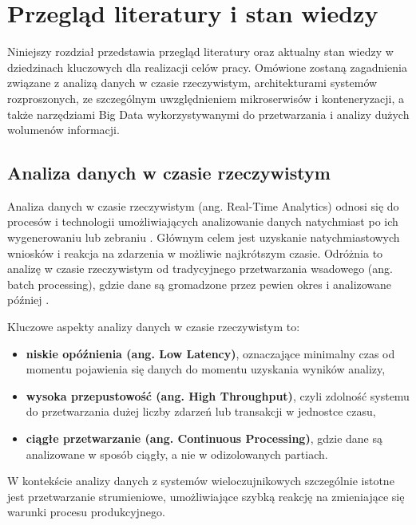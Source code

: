 \section{Przegląd literatury i stan wiedzy}
\label{sec:przeglad_literatury}

Niniejszy rozdział przedstawia przegląd literatury oraz aktualny stan wiedzy w dziedzinach kluczowych dla realizacji celów pracy. Omówione zostaną zagadnienia związane z analizą danych w czasie rzeczywistym, architekturami systemów rozproszonych, ze szczególnym uwzględnieniem mikroserwisów i konteneryzacji, a także narzędziami Big Data wykorzystywanymi do przetwarzania i analizy dużych wolumenów informacji.

\subsection{Analiza danych w czasie rzeczywistym}
\label{subsec:analiza_danych}

Analiza danych w czasie rzeczywistym (ang. Real-Time Analytics) odnosi się do procesów i technologii umożliwiających analizowanie danych natychmiast po ich wygenerowaniu lub zebraniu \cite{realtime_analytics}. Głównym celem jest uzyskanie natychmiastowych wniosków i reakcja na zdarzenia w możliwie najkrótszym czasie. Odróżnia to analizę w czasie rzeczywistym od tradycyjnego przetwarzania wsadowego (ang. batch processing), gdzie dane są gromadzone przez pewien okres i analizowane później \cite{data_processing_models}.

Kluczowe aspekty analizy danych w czasie rzeczywistym to:

\begin{itemize}
    \item \textbf{niskie opóźnienia (ang. Low Latency)}, oznaczające minimalny czas od momentu pojawienia się danych do momentu uzyskania wyników analizy,
    \item \textbf{wysoka przepustowość (ang. High Throughput)}, czyli zdolność systemu do przetwarzania dużej liczby zdarzeń lub transakcji w jednostce czasu,
    \item \textbf{ciągłe przetwarzanie (ang. Continuous Processing)}, gdzie dane są analizowane w sposób ciągły, a nie w odizolowanych partiach.
\end{itemize}

W kontekście analizy danych z systemów wieloczujnikowych szczególnie istotne jest przetwarzanie strumieniowe, umożliwiające szybką reakcję na zmieniające się warunki procesu produkcyjnego.

